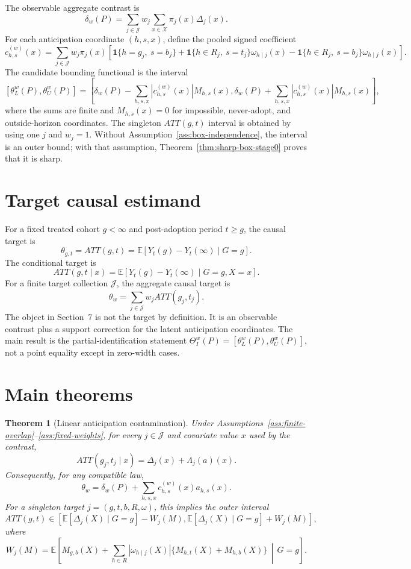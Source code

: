 \documentclass[11pt]{article}
\newcommand{\E}{\mathbb{E}}
\newcommand{\one}{\mathbf{1}}
\theoremstyle{definition}
\theoremstyle{plain}
\newtheorem{theorem}{Theorem}
\theoremstyle{remark}
\begin{document}
The observable aggregate contrast is
\[
  \delta_w(P)=\sum_{j\in\mathcal{J}}w_j
  \sum_{x\in\mathcal{X}}\pi_j(x)\Delta_j(x).
\]
For each anticipation coordinate \((h,s,x)\), define the pooled signed
coefficient
\[
  c^{(w)}_{h,s}(x)
  =
  \sum_{j\in\mathcal{J}}w_j\pi_j(x)
  \left[
    \one\{h=g_j,\ s=b_j\}
    +
    \one\{h\in R_j,\ s=t_j\}\omega_{h\mid j}(x)
    -
    \one\{h\in R_j,\ s=b_j\}\omega_{h\mid j}(x)
  \right].
\]
The candidate bounding functional is the interval
\[
  [\theta_L^w(P),\theta_U^w(P)]
  =
  \left[
    \delta_w(P)-\sum_{h,s,x}|c^{(w)}_{h,s}(x)|M_{h,s}(x),
    \delta_w(P)+\sum_{h,s,x}|c^{(w)}_{h,s}(x)|M_{h,s}(x)
  \right],
\]
where the sums are finite and \(M_{h,s}(x)=0\) for impossible, never-adopt, and
outside-horizon coordinates.  The singleton \(ATT(g,t)\) interval is obtained by
using one \(j\) and \(w_j=1\).  Without
Assumption~\ref{ass:box-independence}, the interval is an outer bound; with that
assumption, Theorem~\ref{thm:sharp-box-stage0} proves that it is sharp.

\section{Target causal estimand}
For a fixed treated cohort \(g<\infty\) and post-adoption period \(t\ge g\), the
causal target is
\[
  \theta_{g,t}=ATT(g,t)
  =
  \E[Y_t(g)-Y_t(\infty)\mid G=g].
\]
The conditional target is
\[
  ATT(g,t\mid x)
  =
  \E[Y_t(g)-Y_t(\infty)\mid G=g,X=x].
\]
For a finite target collection \(\mathcal{J}\), the aggregate causal target is
\[
  \theta_w
  =
  \sum_{j\in\mathcal{J}}w_j ATT(g_j,t_j).
\]
The object in Section~7 is not the target by definition.  It is an observable
contrast plus a support correction for the latent anticipation coordinates.  The
main result is the partial-identification statement
\(\Theta_I^w(P)=[\theta_L^w(P),\theta_U^w(P)]\), not a point equality except in
zero-width cases.

\section{Main theorems}
\begin{theorem}[Linear anticipation contamination]\label{thm:linear-contamination}
Under Assumptions~\ref{ass:finite-overlap}--\ref{ass:fixed-weights}, for every
\(j\in\mathcal{J}\) and covariate value \(x\) used by the contrast,
\[
  ATT(g_j,t_j\mid x)=\Delta_j(x)+\Lambda_j(a)(x).
\]
Consequently, for any compatible law,
\[
  \theta_w
  =
  \delta_w(P)+
  \sum_{h,s,x}c^{(w)}_{h,s}(x)a_{h,s}(x).
\]
For a singleton target \(j=(g,t,b,R,\omega)\), this implies the outer interval
\[
  ATT(g,t)\in
  \left[
  \E[\Delta_j(X)\mid G=g]-W_j(M),
  \E[\Delta_j(X)\mid G=g]+W_j(M)
  \right],
\]
where
\[
  W_j(M)
  =
  \E\!\left[
    M_{g,b}(X)+
    \sum_{h\in R}|\omega_{h\mid j}(X)|
      \{M_{h,t}(X)+M_{h,b}(X)\}
    \,\middle|\,G=g
  \right].
\]
\end{theorem}
\end{document}
